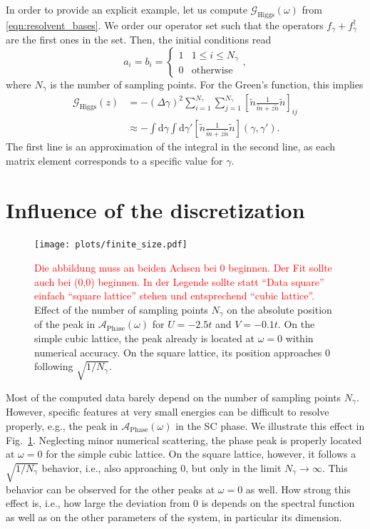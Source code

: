 \documentclass[
    reprint, 
    aps,
    preprintnumbers,
    twocolumn,
    prb,
    superscriptaddress
]{revtex4-2}
\newcommand{\dgamma}{\mathrm{d}\gamma}
\newcommand{\greens}[1]{\mathcal{G}_\text{#1} (\omega)}
\newcommand{\green}[1]{\mathcal{G}_\text{#1}}
\newcommand{\spectral}[1]{\mathcal{A}_\text{#1}  (\omega)}
\newcommand{\bs}{\begin{subequations}}
\newcommand{\es}{\end{subequations}}
\newcommand{\red}[1]{\textcolor{red}{#1}}
\begin{document}
In order to provide an explicit example, 
let us compute $\greens{Higgs}$ from \eqref{eqn:resolvent_bases}.
We order our operator set such that the operators $f_\gamma + f_\gamma^{\dagger}$ are the first ones
in the set. Then, the initial conditions read 
\begin{equation}
    a_i = b_i = \begin{cases}
        1 & 1\le i \le N_\gamma \\
        0 & \text{otherwise}
    \end{cases},
\end{equation}
where $N_\gamma$ is the number of sampling points.
For the Green's function, this implies
\bs
\begin{align}
    \green{Higgs} (z) &= -(\Delta \gamma)^2 \sum_{i=1}^{N_\gamma} \sum_{j=1}^{N_\gamma} \left[ \tilde{n} \frac{1}{\tilde{m} + z \tilde{n}} \tilde{n} \right]_{ij} 
		\\
        &\approx - \int \dgamma \int \dgamma' \left[ \tilde{n} 
				\frac{1}{\tilde{m} + z \tilde{n}} \tilde{n} \right](\gamma, \gamma').
\end{align}
\es
The first line is an approximation of the integral in the second line, as each matrix element corresponds to a specific value for $\gamma$.

\section{Influence of the discretization}
\label{sec:finite_size}

\begin{figure}[htb]
    \centering
    \texttt{[image: plots/finite\_size.pdf]}
    \caption{\red{Die abbildung muss an beiden Achsen bei 0 beginnen. Der Fit sollte auch bei (0,0) 
		beginnen. In der Legende sollte statt "`Data square"' einfach "`square lattice"' stehen und
		entsprechend "`cubic lattice"'.} Effect of the number of  sampling points $N_\gamma$ 
		on the absolute position of the peak in $\spectral{Phase}$ for $U=-2.5t$ and $V=-0.1t$.
    On the simple cubic lattice, the peak already is located at $\omega=0$ within numerical accuracy.
    On the square lattice, its position approaches $0$ following $\sqrt{1/N_\gamma}$.}
    \label{fig:finite_size}
\end{figure}

Most of the computed data barely depend on the number of sampling points $N_\gamma$.
However, specific features at very small energies can be difficult to  resolve properly, e.g., 
the peak in $\spectral{Phase}$ in the SC phase.
We illustrate this effect in Fig.\ \ref{fig:finite_size}.
Neglecting minor numerical scattering, the phase peak is properly located at $\omega=0$ for the simple cubic lattice.
On the square lattice, however, it follows a $\sqrt{1/N_\gamma}$ behavior, i.e., also approaching $0$,
but only in the limit $N_\gamma \to \infty$.
This behavior can be observed for the other peaks at $\omega=0$ as well.
How strong this effect is, i.e., how large the deviation from $0$ is depends on the spectral function
as well as on the other parameters of the system, in particular its dimension.



%
		
\end{document}
